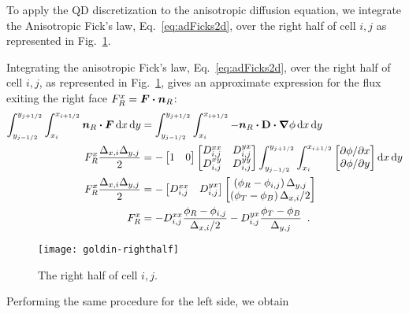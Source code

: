 To apply the QD discretization to the anisotropic diffusion equation,
we integrate the Anisotropic Fick's law, Eq.~\eqref{eq:adFicks2d}, over the
right half of cell $i,j$ as represented in Fig.~\ref{fig:goldinRight}.

Integrating the anisotropic Fick's law, Eq.~\eqref{eq:adFicks2d}, over the right
half of cell $i,j$, as represented in Fig.~\ref{fig:goldinRight}, gives an
approximate expression for the flux exiting the right face $F_R^x =
\bm{F}\bm{\cdot}\bm{n}_R$:
\begin{align*}
\int_{y_{j-1/2}}^{y_{j+1/2}} \int_{x_{i}}^{x_{i+1/2}}
\bm{n}_R \bm{\cdot} \bm{F}
\mathop{}\!\mathrm{d} x \mathop{}\!\mathrm{d} y
&=
\int_{y_{j-1/2}}^{y_{j+1/2}} \int_{x_{i}}^{x_{i+1/2}}
-\bm{n}_R \bm{\cdot} \mathbf{D} \bm{\cdot} \bm{\nabla} \phi
\mathop{}\!\mathrm{d} x \mathop{}\!\mathrm{d} y
\\
F_R^x \frac{\Delta_{x,i} \Delta_{y,j}}{2}
&=
-
\begin{bmatrix}
  1 & 0
\end{bmatrix}
\begin{bmatrix}
  D_{i,j}^{xx} & D_{i,j}^{yx} \\
  D_{i,j}^{xy} & D_{i,j}^{yy}
\end{bmatrix}
\int_{y_{j-1/2}}^{y_{j+1/2}} \int_{x_{i}}^{x_{i+1/2}}
\begin{bmatrix}
  {\partial \phi}/{\partial x} \\
  {\partial \phi}/{\partial y}
\end{bmatrix}
\mathop{}\!\mathrm{d} x \mathop{}\!\mathrm{d} y
\\
F_R^x \frac{\Delta_{x,i} \Delta_{y,j}}{2}
&=
-
\begin{bmatrix}
  D_{i,j}^{xx} & D_{i,j}^{yx}
\end{bmatrix}
\begin{bmatrix}
  \left( \phi_R - \phi_{i,j} \right) \Delta_{y,j} \\
  \left( \phi_T - \phi_B \right) \Delta_{x,i} / 2
\end{bmatrix}
\\
F_R^x
&= 
- D_{i,j}^{xx} \frac{\phi_R - \phi_{i,j}}{ \Delta_{x,i} / 2}
- D_{i,j}^{yx} \frac{\phi_T - \phi_B}{ \Delta_{y,j} }\ \,.
\end{align*}
%
\begin{figure}[htb]
  \centering
  \texttt{[image: goldin-righthalf]}
  \caption{The right half of cell $i,j$.}
  \label{fig:goldinRight}
\end{figure}
%
Performing the same procedure for the left side, we obtain

